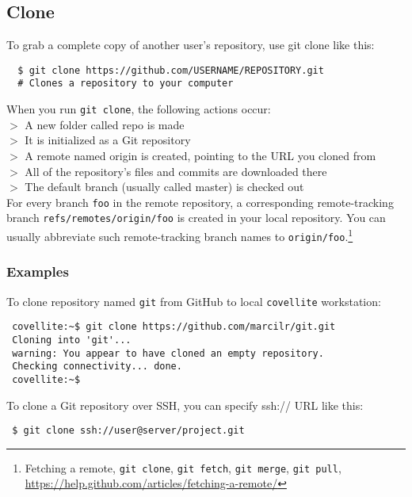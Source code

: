 \documentclass[12pt,letterpaper,dvips]{article}
\newcommand{\cmd}[1]{\texttt{#1}}
\begin{document}
\subsection{Clone}
To grab a complete copy of another user's repository, use git clone like this:

\begin{Verbatim}
  $ git clone https://github.com/USERNAME/REPOSITORY.git
  # Clones a repository to your computer
\end{Verbatim}

\noindent When you run \cmd{git clone}, the following actions occur:\\
$>$ A new folder called repo is made\\
$>$ It is initialized as a Git repository\\
$>$ A remote named origin is created, pointing to the URL you cloned from\\
$>$ All of the repository's files and commits are downloaded there\\
$>$ The default branch (usually called master) is checked out\\

\noindent For every branch \cmd{foo} in the remote repository, a corresponding remote-tracking
branch \cmd{refs/remotes/origin/foo} is created in your local repository.  You can
usually abbreviate such remote-tracking branch names to \cmd{origin/foo}.\footnote{Fetching a remote,
\cmd{git clone}, \cmd{git fetch}, \cmd{git merge}, \cmd{git pull},
\href{https://help.github.com/articles/fetching-a-remote/}{https://help.github.com/articles/fetching-a-remote/}}


\subsubsection{Examples}
To clone repository named \cmd{git} from GitHub to local \cmd{covellite} workstation:
\begin{Verbatim}
 covellite:~$ git clone https://github.com/marcilr/git.git
 Cloning into 'git'...
 warning: You appear to have cloned an empty repository.
 Checking connectivity... done.
 covellite:~$
\end{Verbatim}

\newpage
\noindent To clone a Git repository over SSH, you can specify ssh:// URL like this:\\
\begin{Verbatim}
 $ git clone ssh://user@server/project.git
\end{Verbatim}
\end{document}
